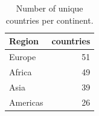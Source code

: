 \begin{table}
\caption{Number of unique countries per continent.}
\label{tab:country-dist-region}
\begin{tabular}{lr}
\toprule
Region & countries \\
\midrule
Europe & 51 \\
Africa & 49 \\
Asia & 39 \\
Americas & 26 \\
\bottomrule
\end{tabular}
\end{table}
